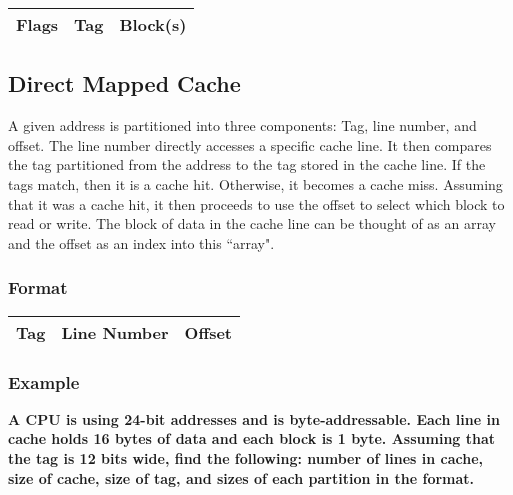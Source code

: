 \documentclass[11pt]{article}
\begin{document}
\begin{table}[H]
	\centering
	\begin{tabular}{| c | c | c |}
		\hline
		Flags	&	\hspace{.5cm} Tag \hspace{.5cm} 		&	\hspace{1cm} Block(s) \hspace{1cm} \\
		\hline
	\end{tabular}
\end{table}

\subsection{Direct Mapped Cache}

A given address is partitioned into three components: Tag, line number, and offset. The line number directly accesses a specific cache line. It then compares the tag partitioned from the address to the tag stored in the cache line. If the tags match, then it is a cache hit. Otherwise, it becomes a cache miss. Assuming that it was a cache hit, it then proceeds to use the offset to select which block to read or write. The block of data in the cache line can be thought of as an array and the offset as an index into this ``array".

\subsubsection{Format}

\begin{table}[H]
	\centering
	\begin{tabular}{| c | c | c |}
		\hline
		Tag		&	Line Number		&		 Offset\\
		\hline
	\end{tabular}
\end{table}

\subsubsection{Example}

\textbf{A CPU is using 24-bit addresses and is byte-addressable. Each line in cache holds 16 bytes of data and each block is 1 byte. Assuming that the tag is 12 bits wide, find the following: number of lines in cache, size of cache, size of tag, and sizes of each partition in the format.}
\end{document}
